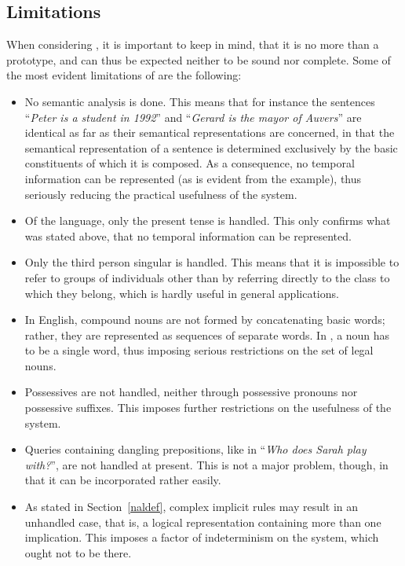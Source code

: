 \subsection{Limitations}
\label{limnal}

When considering {\nal}, it is important to keep in mind, that it is
no more than a prototype, and can thus be expected neither to be sound
nor complete. Some of the most evident limitations of {\nal} are the
following:

\begin{itemize}
\item No semantic analysis is done. This means that for instance the
  sentences ``{\em Peter is a student in 1992\/}'' and ``{\em Gerard
  is the mayor of Auvers\/}'' are identical as far as their semantical
  representations are concerned, in that the semantical representation
  of a sentence is determined exclusively by the basic constituents of
  which it is composed. As a consequence, no temporal information can
  be represented (as is evident from the example), thus seriously
  reducing the practical usefulness of the system.
\item Of the language, only the present tense is handled. This only
  confirms what was stated above, that no temporal information can be
  represented.
\item Only the third person singular is handled. This means that it is
  impossible to refer to groups of individuals other than by referring
  directly to the class to which they belong, which is hardly useful
  in general applications.
\item In English, compound nouns are not formed by concatenating
  basic words; rather, they are represented as sequences of separate
  words. In {\nal}, a noun has to be a single word, thus imposing
  serious restrictions on the set of legal nouns.
\item Possessives are not handled, neither through possessive pronouns
  nor possessive suffixes. This imposes further restrictions on the
  usefulness of the system.
\item Queries containing dangling prepositions, like in ``{\em Who
  does Sarah play with?\/}'', are not handled at present. This is not
  a major problem, though, in that it can be incorporated rather
  easily.
\item As stated in Section~\ref{naldef}, complex implicit rules may
  result in an unhandled case, that is, a logical representation
  containing more than one implication. This imposes a factor of
  indeterminism on the system, which ought not to be there.
\end{itemize}
